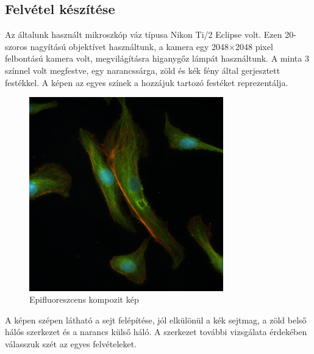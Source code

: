 \documentclass[12pt, a4paper]{article}
\begin{document}
\subsection{Felvétel készítése}
Az általunk használt mikroszkóp váz típusa Nikon Ti/2 Eclipse volt. Ezen 20-szoros nagyítású objektívet használtunk, a kamera egy 2048$\times$2048 pixel felbontású kamera volt, megvilágításra higanygőz lámpát használtunk. A minta 3 színnel volt megfestve, egy narancssárga, zöld és kék fény által gerjesztett festékkel. A képen az egyes színek a hozzájuk tartozó festéket reprezentálja. 
\begin{figure}[H]
\centering
\includegraphics[width=0.75\textwidth]{./Confocal/Epi.png}
\caption{Epifluoreszcens kompozit kép}
\end{figure}
A képen szépen látható a sejt felépítése, jól elkülönül a kék sejtmag, a zöld belső hálós szerkezet és a narancs külső háló. A szerkezet további vizsgálata érdekében válasszuk szét az egyes felvételeket.
\end{document}
